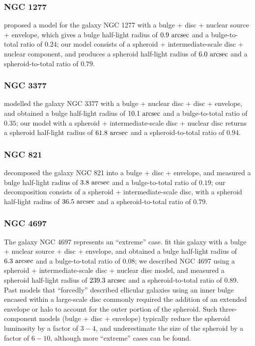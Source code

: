 \documentclass[useAMS,usenatbib,article]{mn2e}
\begin{document}
\subsubsection{NGC 1277}
\cite{vandenbosch2012} proposed a model for the galaxy NGC 1277 with a bulge + disc + nuclear source + envelope, 
which gives a bulge half-light radius of $0.9~\rm arcsec$ and a bulge-to-total ratio of $0.24$; 
our model consists of a spheroid + intermediate-scale disc + nuclear component, 
and produces a spheroid half-light radius of $6.0~\rm arcsec$ and a spheroid-to-total ratio of $0.79$. 

\subsubsection{NGC 3377}
\cite{lasker2014data} modelled the galaxy NGC 3377 with a bulge + nuclear disc + disc + envelope, 
and obtained a bulge half-light radius of $10.1~\rm arcsec$ and a bulge-to-total ratio of $0.35$; 
our model with a spheroid + intermediate-scale disc + nuclear disc 
returns a spheroid half-light radius of $61.8~\rm arcsec$ and a spheroid-to-total ratio of $0.94$. 

\subsubsection{NGC 821}
\cite{lasker2014data} decomposed the galaxy NGC 821 into a bulge + disc + envelope, 
and measured a bulge half-light radius of $3.8~\rm arcsec$ and a bulge-to-total ratio of $0.19$; 
our decomposition consists of a spheroid + intermediate-scale disc, 
with a spheroid half-light radius of $36.5~\rm arcsec$ and a spheroid-to-total ratio of $0.79$. 

\subsubsection{NGC 4697}
The galaxy NGC 4697 represents an ``extreme'' case. 
\cite{lasker2014data} fit this galaxy with a bulge + nuclear source + disc + envelope, 
and obtained a bulge half-light radius of $6.3~\rm arcsec$ and a bulge-to-total ratio of $0.08$; 
we described NGC 4697 using a spheroid + intermediate-scale disc + nuclear disc model, 
and measured a spheroid half-light radius of $239.3~\rm arcsec$ and a spheroid-to-total ratio of $0.89$. \\

Past models that ``forcedly'' described ellicular galaxies using an inner bulge 
encased within a large-scale disc 
commonly required the addition of an extended envelope or halo to account for the outer portion of the spheroid. 
Such three-component models (bulge + disc + envelope) typically reduce the spheroid luminosity by a factor of $3-4$, 
and underestimate the size of the spheroid by a factor of $6-10$, 
although more ``extreme'' cases can be found. 
\end{document}
